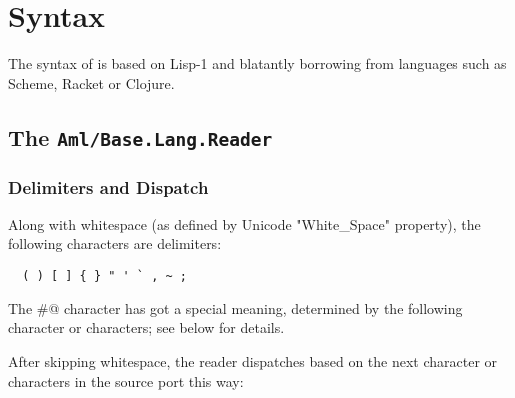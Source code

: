 
\chapter{Syntax}
\label{ch:aml-base-syntax}

The syntax of \AmlBase is based on Lisp-1 and blatantly borrowing from languages such as Scheme, Racket or Clojure.




\section[The Aml/Base.Lang.Reader]{The \lstinline!Aml/Base.Lang.Reader!}
\label{sec:aml-base-lang-reader}




\subsection{Delimiters and Dispatch}

Along with whitespace (as defined by Unicode "White\_Space" property), the following characters are delimiters:

\begin{lstlisting}
  ( ) [ ] { } " ' ` , ~ ;
\end{lstlisting}

The \lstinline@#@ character has got a special meaning, determined by the following character or characters; see below for details. 

After skipping whitespace, the \AmlBase reader dispatches based on the next character or characters in the source port this way:

